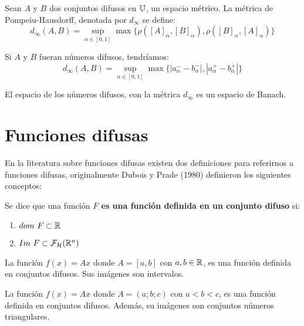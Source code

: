   \begin{definicion}
    \label{def:metricadifusa}
    Sean $A$ y $B$ dos conjuntos difusos en $\mathbb U$, un espacio métrico. La métrica de Pompeiu-Hausdorff, denotada por $d_\infty$ se define:
    \[
    d_\infty(A, B) = \sup\limits_{\alpha \in [0, 1]} \max\{\rho([A]_\alpha, [B]_\alpha), \rho([B]_\alpha,  [A]_\alpha)\}
    \]
    
    Si $A$ y $B$ fueran números difusos, tendríamos:
    \[
    d_\infty(A, B) = \sup\limits_{\alpha \in [0, 1]} \max\{|a_\alpha^- - b_\alpha^-|, |a_\alpha^+ - b_\alpha^+|\}
    \]
  \end{definicion}

  \begin{teorema}
    \label{teorema:banach}
    El espacio de los números difusos, con la métrica $d_\infty$ es un espacio de Banach.
  \end{teorema}

  \section{Funciones difusas}
  En la literatura sobre funciones difusas existen dos definiciones para referirnos a funciones difusas, originalmente Dubois y Prade (1980) definieron los siguientes conceptos:

  \begin{definicion}
    \label{def:fizzusetvaluedfunc} Se dice que una función \textbf{$F$ es una función definida en un conjunto difuso} si:
    \begin{enumerate}
    \item $dom ~ F \subset \mathbb R$
    \item $Im ~ F \subset \mathcal{F}_\mathcal{H}(\mathbb R^n)$
    \end{enumerate}
  \end{definicion}

  \begin{ejemplo}
    La función $f(x) = A x$ donde $A=[a, b]$ con $a, b \in \mathbb R$, es una función definida en conjuntos difusos. Sus imágenes son intervalos.
  \end{ejemplo}

  \begin{ejemplo}
    La función $f(x) = A x$ donde $A=(a;b;c)$ con $a<b<c$, es una función definida en conjuntos difusos. Además, su imágenes son conjuntos números triangulares.
  \end{ejemplo}


